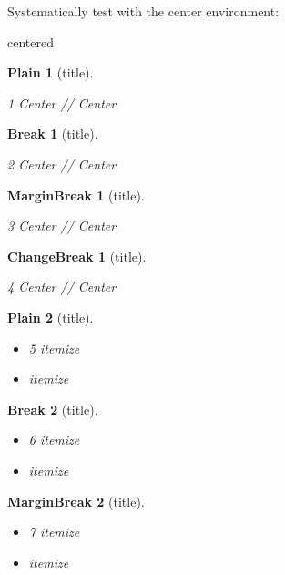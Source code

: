 \documentclass[twoside,11pt]{article}
\theoremstyle{lines}
\theoremstyle{longplain}
\begin{document}
\newpage
Systematically test with the center environment:

\begin{center}
  centered
\end{center}
\theoremstyle{plain}
 \newtheorem{Plain}{Plain}
 \begin{Plain}[title]
 \begin{center} 1 Center // Center \end{center}
 \end{Plain}

\theoremstyle{break}
 \newtheorem{Break}{Break}
 \begin{Break}[title]
 \begin{center} 2 Center // Center \end{center}
 \end{Break}

\theoremstyle{marginbreak}
 \newtheorem{mBreak}{MarginBreak}
 \begin{mBreak}[title]
 \begin{center} 3 Center // Center \end{center}
 \end{mBreak}

\theoremstyle{changebreak}
 \newtheorem{cBreak}{ChangeBreak}
 \begin{cBreak}[title]
 \begin{center} 4 Center // Center \end{center}
 \end{cBreak}

 \begin{Plain}[title]
 \begin{itemize} \item 5 itemize \item itemize \end{itemize}
 \end{Plain}

 \begin{Break}[title]
 \begin{itemize} \item 6 itemize \item itemize \end{itemize}
 \end{Break}

 \begin{mBreak}[title]
 \begin{itemize} \item 7 itemize \item itemize \end{itemize}
 \end{mBreak}
\end{document}
